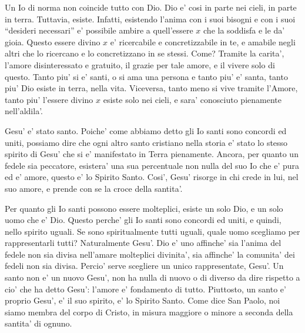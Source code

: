 Un Io di norma non coincide tutto con Dio. Dio e' cosi in parte nei cieli, in parte in terra. Tuttavia, esiste. Infatti, esistendo l'anima con i suoi bisogni e con i suoi ``desideri necessari'' e' possibile ambire a quell'essere $x$ che la soddisfa e le da' gioia. Questo essere divino $x$ e' ricercabile e concretizzabile in te, e amabile negli altri che lo ricercano e lo concretizzano in se stessi. Come? Tramite la carita',  l'amore disinteressato e gratuito, il grazie per tale amore, e il vivere solo di questo. Tanto piu' si e' santi, o si ama una persona e tanto piu' e' santa, tanto piu' Dio esiste in terra, nella vita. Viceversa, tanto meno si vive tramite l'Amore, tanto piu' l'essere divino $x$ esiste solo nei cieli, e sara' conosciuto pienamente nell'aldila'. 

Gesu' e' stato santo. Poiche' come abbiamo detto gli Io santi sono concordi ed uniti, possiamo dire che ogni altro santo cristiano nella storia e' stato lo stesso spirito di Gesu' che si e' manifestato in Terra pienamente. Ancora, per quanto un fedele sia peccatore, esistera' una sua percentuale non nulla del suo Io che e' pura ed e' amore, questo e' lo Spirito Santo. Cosi', Gesu' risorge in chi crede in lui, nel suo amore, e prende con se la croce della santita'.

Per quanto gli Io santi possono essere molteplici, esiste un solo Dio, e un solo uomo che e' Dio. Questo perche' gli Io santi sono concordi ed uniti, e quindi, nello spirito uguali. Se sono spiritualmente tutti uguali, quale uomo scegliamo per rappresentarli tutti? Naturalmente Gesu'. Dio e' uno affinche' sia l'anima del fedele non sia divisa nell'amare molteplici divinita', sia affinche' la comunita' dei fedeli non sia divisa. Percio' serve scegliere un unico rappresentate, Gesu'. Un santo non e' un nuovo Gesu', non ha nulla di nuovo o di diverso da dire rispetto a cio' che ha detto Gesu': l'amore e' fondamento di tutto. Piuttosto, un santo e' proprio Gesu', e' il suo spirito, e' lo Spirito Santo. Come dice San Paolo, noi siamo membra del corpo di Cristo, in misura maggiore o minore a seconda della santita' di ognuno.

